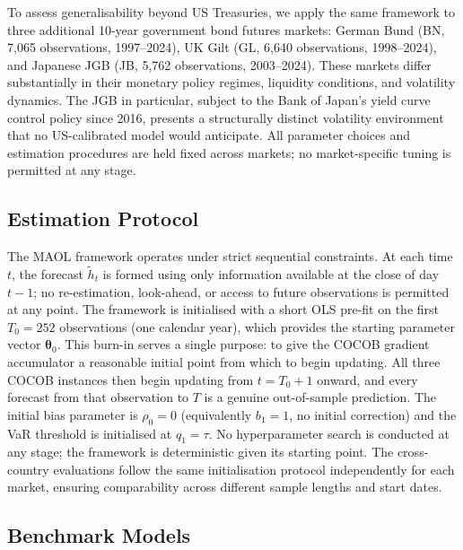 To assess generalisability beyond US Treasuries, we apply the same framework to three additional 10-year government bond futures markets: German Bund (BN, 7,065 observations, 1997--2024), UK Gilt (GL, 6,640 observations, 1998--2024), and Japanese JGB (JB, 5,762 observations, 2003--2024). These markets differ substantially in their monetary policy regimes, liquidity conditions, and volatility dynamics. The JGB in particular, subject to the Bank of Japan's yield curve control policy since 2016, presents a structurally distinct volatility environment that no US-calibrated model would anticipate. All parameter choices and estimation procedures are held fixed across markets; no market-specific tuning is permitted at any stage.

\subsection{Estimation Protocol}\label{sec:protocol}

The MAOL framework operates under strict sequential constraints. At each time $t$, the forecast $\tilde{h}_t$ is formed using only information available at the close of day $t-1$; no re-estimation, look-ahead, or access to future observations is permitted at any point. The framework is initialised with a short OLS pre-fit on the first $T_0 = 252$ observations (one calendar year), which provides the starting parameter vector $\boldsymbol{\theta}_0$. This burn-in serves a single purpose: to give the COCOB gradient accumulator a reasonable initial point from which to begin updating. All three COCOB instances then begin updating from $t = T_0 + 1$ onward, and every forecast from that observation to $T$ is a genuine out-of-sample prediction. The initial bias parameter is $\rho_0 = 0$ (equivalently $b_1 = 1$, no initial correction) and the VaR threshold is initialised at $q_1 = \tau$. No hyperparameter search is conducted at any stage; the framework is deterministic given its starting point. The cross-country evaluations follow the same initialisation protocol independently for each market, ensuring comparability across different sample lengths and start dates.

\subsection{Benchmark Models}\label{sec:benchmarks}

